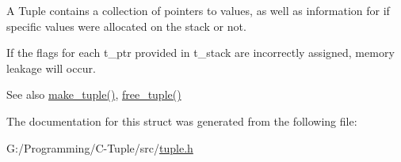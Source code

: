 A Tuple contains a collection of pointers to values, as well as information for if specific values were allocated on the stack or not.

If the flags for each t\+\_\+ptr provided in t\+\_\+stack are incorrectly assigned, memory leakage will occur.

\begin{DoxySeeAlso}{See also}
\hyperlink{tuple_8h_a73b2ab5636bd0c07072be9d5301da0ec}{make\+\_\+tuple()}, \hyperlink{tuple_8h_aecfbe1880635d915243610c074f441bb}{free\+\_\+tuple()} 
\end{DoxySeeAlso}


The documentation for this struct was generated from the following file\+:\begin{DoxyCompactItemize}
\item 
G\+:/\+Programming/\+C-\/\+Tuple/src/\hyperlink{tuple_8h}{tuple.\+h}\end{DoxyCompactItemize}
